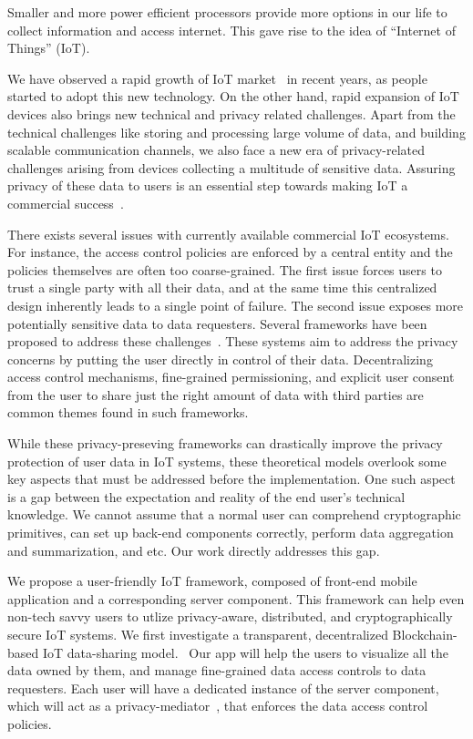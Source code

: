 Smaller and more power efficient processors provide more options in our life to collect information and access internet. This gave rise to the idea of ``Internet of Things'' (IoT).

We have observed a rapid growth of IoT market~\cite{idc} in recent years, as people started to adopt this new technology. On the other hand, rapid expansion of IoT devices also brings new technical and privacy related challenges. Apart from the technical challenges like storing and processing large volume of data, and building scalable communication channels, we also face a new era of privacy-related challenges arising from devices collecting a multitude of sensitive data. Assuring privacy of these data to users is an essential step towards making IoT a commercial success~\cite{davies}.

There exists several issues with currently available commercial IoT ecosystems. For instance, the access control policies are enforced by a central entity and the policies themselves are often too coarse-grained. The first issue forces users to trust a single party with all their data, and at the same time this centralized design inherently leads to a single point of failure. The second issue exposes more potentially sensitive data  to data requesters. Several frameworks have been proposed to address these challenges~\cite{campbell,davies}. These systems aim to address the privacy concerns by putting the user directly in control of their data. Decentralizing access control mechanisms, fine-grained permissioning, and explicit user consent from the user to share just the right amount of data with third parties are common themes found in such frameworks.

While these privacy-preseving frameworks can drastically improve the privacy protection of user data in IoT systems, these theoretical models overlook some key aspects that must be addressed before the implementation. One such aspect is a gap between the expectation and reality of the end user's technical knowledge. We cannot assume that a normal user can comprehend cryptographic primitives, can set up back-end components correctly, perform data aggregation and summarization, and etc. Our work directly addresses this gap.

We propose a user-friendly IoT framework, composed of front-end mobile application and a corresponding server component. This framework can help even non-tech savvy users to  utlize privacy-aware, distributed, and cryptographically secure IoT systems. We first investigate a transparent, decentralized Blockchain-based IoT data-sharing model.~\cite{campbell} Our app will help the users to visualize all the data owned by them, and manage fine-grained data access controls to data requesters. Each user will have a dedicated instance of the server component, which will act as a privacy-mediator~\cite{davies}, that enforces the data access control policies.

